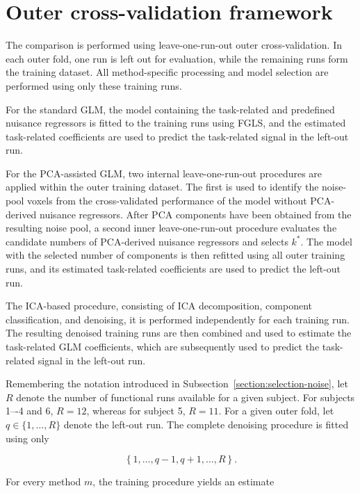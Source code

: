 \documentclass[english]{pwr_wmat_praca_dyplomowa}
\theoremstyle{definition}
\theoremstyle{remark}
\begin{document}
\section{Outer cross-validation framework}
\label{section:outer-cv-evaluation}

The comparison is performed using leave-one-run-out outer cross-validation. In each outer fold, one run is left out for evaluation, while the remaining runs form the training dataset. All method-specific processing and model selection are performed using only these training runs. 

For the standard GLM, the model containing the task-related and predefined nuisance regressors is fitted to the training runs using FGLS, and the estimated task-related coefficients are used to predict the task-related signal in the left-out run. 

For the PCA-assisted GLM, two internal leave-one-run-out procedures are applied within the outer training dataset. The first is used to identify the noise-pool voxels from the cross-validated performance of the model without PCA-derived nuisance regressors. After PCA components have been obtained from the resulting noise pool, a second inner leave-one-run-out procedure evaluates the candidate numbers of PCA-derived nuisance regressors and selects $k^\ast$. The model with the selected number of components is then refitted using all outer training runs, and its estimated task-related coefficients are used to predict the left-out run. 

The ICA-based procedure, consisting of ICA decomposition, component classification, and denoising, it is performed independently for each training run. The resulting denoised training runs are then combined and used to estimate the task-related GLM coefficients, which are subsequently used to predict the task-related signal in the left-out run. 

Remembering the notation introduced in Subsection~\ref{section:selection-noise}, let $R$ denote the number of functional runs available for a given subject. For subjects 1–-4 and 6, $R=12$, whereas for subject 5, $R=11$. For a given outer fold, let $q\in\{1,\ldots,R\}$ denote the left-out run. The complete denoising procedure is fitted using only

\begin{equation}
    \left\{1,\ldots,q-1,q+1,\ldots,R\right\}.
\end{equation}

For every method $m$, the training procedure yields an estimate
\end{document}
